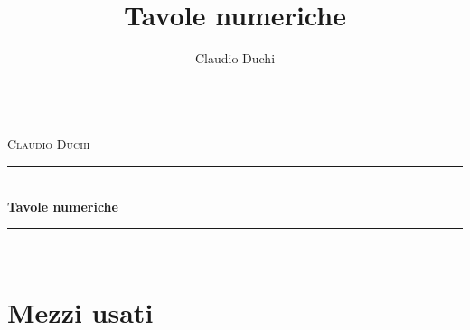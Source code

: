 \documentclass[openany,a4paper]{book}%
\title{Tavole numeriche}
\author{Claudio Duchi}
\date{\datetime}
\makeatletter
\newcommand{\HRule}{\rule{\linewidth}{0.5mm}}
\renewcommand\frontmatter{%
\cleardoublepage
\@mainmatterfalse
}
\renewcommand\mainmatter{%
\cleardoublepage
\@mainmattertrue
}
\makeatother
\begin{document}
\frontmatter
\hypersetup{pageanchor=false}
\begin{titlepage}
\begin{center}
	\Lgrandedue\\[1cm]    
\textsc{\LARGE Claudio Duchi}\\[1.5cm]
\HRule\\[0.4cm]
{ \huge \bfseries Tavole numeriche}\\[0.4cm]
\HRule\\[1.5cm]
\vfill
\end{center}
\begin{center}
\end{center}
\end{titlepage}
\hypersetup{pageanchor=true}
\CDcopyright
\tableofcontents
\mainmatter
	 
\cleardoublepage
{}
\printindex
\appendix
\chapter{Mezzi usati}
\CDMezziUsati
\end{document}
